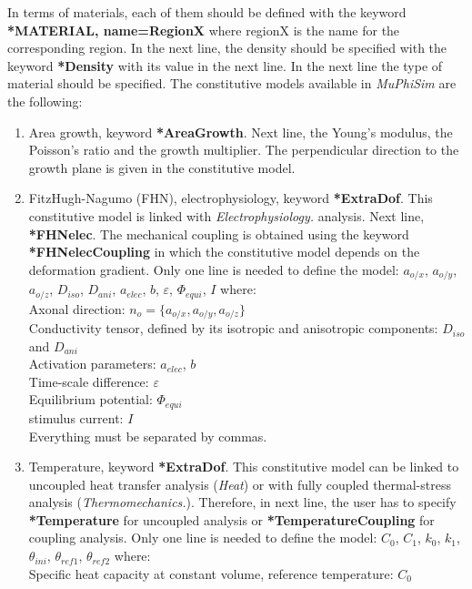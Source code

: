 \documentclass[oneside,11pt,times]{book}
\begin{document}
In terms of materials, each of them should be defined with the keyword \textbf{*MATERIAL, name=RegionX} where regionX is the name for the corresponding region. In the next line, the density should be specified with the keyword \textbf{*Density} with its value in the next line. In the next line the type of material should be specified. The constitutive models available in \textit{MuPhiSim} are the following:
\begin{enumerate}

\item Area growth, keyword \textbf{*AreaGrowth}. Next line, the Young's modulus, the Poisson's ratio and the growth multiplier. The perpendicular direction to the growth plane is given in the constitutive model.
\item FitzHugh-Nagumo (FHN), electrophysiology, keyword \textbf{*ExtraDof}. This constitutive model is linked with \textit{Electrophysiology.} analysis. Next line, \textbf{*FHNelec}.  The mechanical coupling is obtained using the keyword \textbf{*FHNelecCoupling} in which the constitutive model depends on the deformation gradient. Only one line is needed to define the model: $a_{o/x}$, $a_{o/y}$, $a_{o/z}$, $D_{iso}$, $D_{ani}$, $a_{elec}$, $b$, $\varepsilon$, $\Phi_{equi}$, $I$ where: \\
Axonal direction: $n_o = \{a_{o/x}, a_{o/y}, a_{o/z}\}$\\
Conductivity tensor, defined by its isotropic and anisotropic components: $D_{iso}$ and $D_{ani}$\\
Activation parameters: $a_{elec}$, $b$\\
Time-scale difference: $\varepsilon$\\
Equilibrium potential: $\Phi_{equi}$\\
stimulus current: $I$\\
Everything must be separated by commas.
\item Temperature, keyword \textbf{*ExtraDof}. This constitutive model can be linked to uncoupled heat transfer analysis (\textit{Heat}) or with fully coupled thermal-stress analysis (\textit{Thermomechanics.}). Therefore, in next line, the user has to specify \textbf{*Temperature} for uncoupled analysis or \textbf{*TemperatureCoupling} for coupling analysis.
Only one line is needed to define the model: $C_0$, $C_1$, $k_0$, $k_1$, $\theta_{ini}$, $\theta_{ref1}$, $\theta_{ref2}$ where:  \\
Specific heat capacity at constant volume, reference temperature: $C_0$\\

\end{enumerate}
\end{document}
